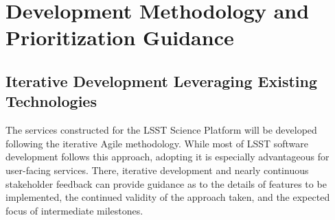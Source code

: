 \documentclass[DM,lsstdraft,toc]{lsstdoc}
\begin{document}
%
%
%
%
%

\section{Development Methodology and Prioritization Guidance}

\subsection{Iterative Development Leveraging Existing Technologies }

The services constructed for the LSST Science Platform will be developed following the iterative Agile methodology. While most of LSST software development follows this approach, adopting it is especially advantageous for user-facing services. There, iterative development and nearly continuous stakeholder feedback can provide guidance as to the details of features to be implemented, the continued validity of the approach taken, and the expected focus of intermediate milestones.
\end{document}
